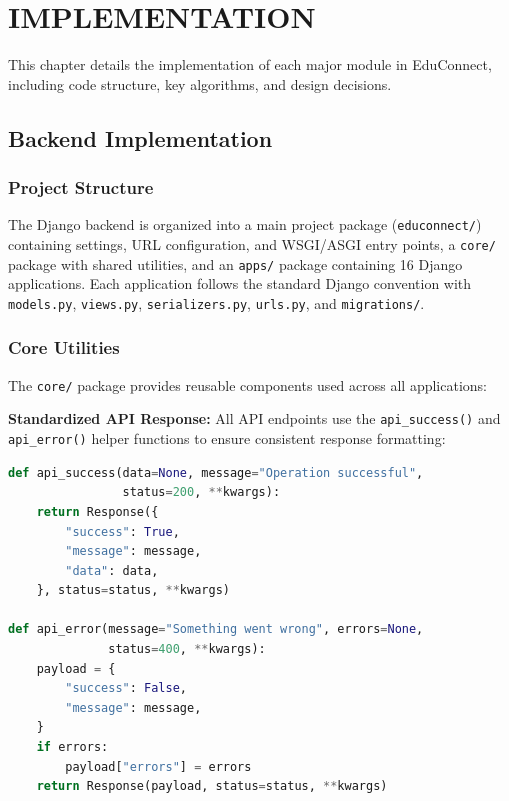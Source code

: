 \newpage
\section{IMPLEMENTATION}
\hline

This chapter details the implementation of each major module in EduConnect, including code structure, key algorithms, and design decisions.

\subsection{Backend Implementation}

\subsubsection{Project Structure}

The Django backend is organized into a main project package (\texttt{educonnect/}) containing settings, URL configuration, and WSGI/ASGI entry points, a \texttt{core/} package with shared utilities, and an \texttt{apps/} package containing 16 Django applications. Each application follows the standard Django convention with \texttt{models.py}, \texttt{views.py}, \texttt{serializers.py}, \texttt{urls.py}, and \texttt{migrations/}.

\subsubsection{Core Utilities}

The \texttt{core/} package provides reusable components used across all applications:

\textbf{Standardized API Response:} All API endpoints use the \texttt{api\_success()} and \texttt{api\_error()} helper functions to ensure consistent response formatting:

\begin{lstlisting}[language=Python, caption={Standardized Response Functions (core/response.py)}]
def api_success(data=None, message="Operation successful", 
                status=200, **kwargs):
    return Response({
        "success": True,
        "message": message,
        "data": data,
    }, status=status, **kwargs)

def api_error(message="Something went wrong", errors=None, 
              status=400, **kwargs):
    payload = {
        "success": False,
        "message": message,
    }
    if errors:
        payload["errors"] = errors
    return Response(payload, status=status, **kwargs)
\end{lstlisting}

